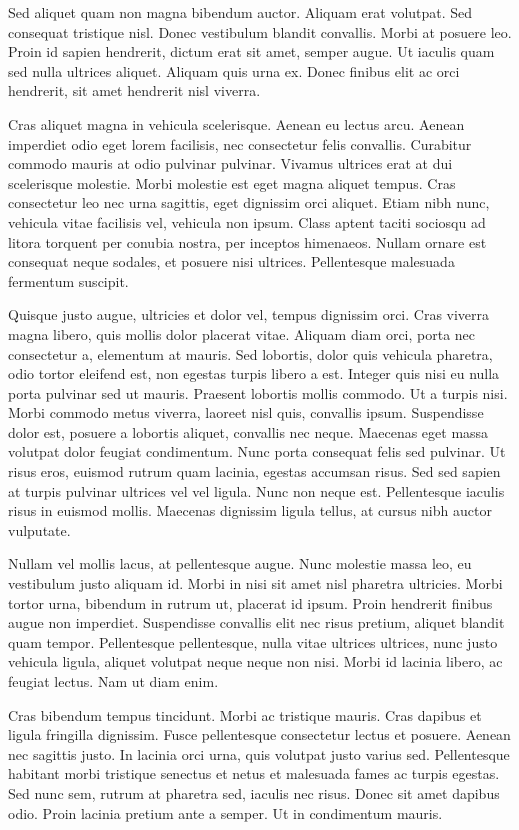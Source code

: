 \documentclass{article}
\begin{document}
Sed aliquet quam non magna bibendum auctor. Aliquam erat volutpat. Sed consequat tristique nisl. Donec vestibulum blandit convallis. Morbi at posuere leo. Proin id sapien hendrerit, dictum erat sit amet, semper augue. Ut iaculis quam sed nulla ultrices aliquet. Aliquam quis urna ex. Donec finibus elit ac orci hendrerit, sit amet hendrerit nisl viverra.

Cras aliquet magna in vehicula scelerisque. Aenean eu lectus arcu. Aenean imperdiet odio eget lorem facilisis, nec consectetur felis convallis. Curabitur commodo mauris at odio pulvinar pulvinar. Vivamus ultrices erat at dui scelerisque molestie. Morbi molestie est eget magna aliquet tempus. Cras consectetur leo nec urna sagittis, eget dignissim orci aliquet. Etiam nibh nunc, vehicula vitae facilisis vel, vehicula non ipsum. Class aptent taciti sociosqu ad litora torquent per conubia nostra, per inceptos himenaeos. Nullam ornare est consequat neque sodales, et posuere nisi ultrices. Pellentesque malesuada fermentum suscipit.

Quisque justo augue, ultricies et dolor vel, tempus dignissim orci. Cras viverra magna libero, quis mollis dolor placerat vitae. Aliquam diam orci, porta nec consectetur a, elementum at mauris. Sed lobortis, dolor quis vehicula pharetra, odio tortor eleifend est, non egestas turpis libero a est. Integer quis nisi eu nulla porta pulvinar sed ut mauris. Praesent lobortis mollis commodo. Ut a turpis nisi. Morbi commodo metus viverra, laoreet nisl quis, convallis ipsum. Suspendisse dolor est, posuere a lobortis aliquet, convallis nec neque. Maecenas eget massa volutpat dolor feugiat condimentum. Nunc porta consequat felis sed pulvinar. Ut risus eros, euismod rutrum quam lacinia, egestas accumsan risus. Sed sed sapien at turpis pulvinar ultrices vel vel ligula. Nunc non neque est. Pellentesque iaculis risus in euismod mollis. Maecenas dignissim ligula tellus, at cursus nibh auctor vulputate.

Nullam vel mollis lacus, at pellentesque augue. Nunc molestie massa leo, eu vestibulum justo aliquam id. Morbi in nisi sit amet nisl pharetra ultricies. Morbi tortor urna, bibendum in rutrum ut, placerat id ipsum. Proin hendrerit finibus augue non imperdiet. Suspendisse convallis elit nec risus pretium, aliquet blandit quam tempor. Pellentesque pellentesque, nulla vitae ultrices ultrices, nunc justo vehicula ligula, aliquet volutpat neque neque non nisi. Morbi id lacinia libero, ac feugiat lectus. Nam ut diam enim.

Cras bibendum tempus tincidunt. Morbi ac tristique mauris. Cras dapibus et ligula fringilla dignissim. Fusce pellentesque consectetur lectus et posuere. Aenean nec sagittis justo. In lacinia orci urna, quis volutpat justo varius sed. Pellentesque habitant morbi tristique senectus et netus et malesuada fames ac turpis egestas. Sed nunc sem, rutrum at pharetra sed, iaculis nec risus. Donec sit amet dapibus odio. Proin lacinia pretium ante a semper. Ut in condimentum mauris.
\end{document}
